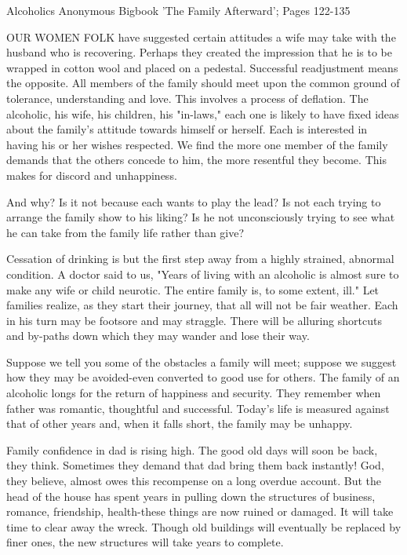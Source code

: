 
Alcoholics Anonymous Bigbook 'The Family Afterward'; Pages 122-135

\begin{biblechapter}
OUR WOMEN FOLK have suggested certain attitudes a wife may take with the husband who is recovering.  Perhaps they created the impression that he is to be wrapped in cotton wool and placed on a pedestal.  Successful readjustment means the opposite.  All members of the family should meet upon the common ground of tolerance, understanding and love.  This involves a process of deflation.  The alcoholic, his wife, his children, his "in-laws," each one is likely to have fixed ideas about the family's attitude towards himself or herself.  Each is interested in having his or her wishes respected.  We find the more one member of the family demands that the others concede to him, the more resentful they become.  This makes for discord and unhappiness.

And why?  Is it not because each wants to play the lead?  Is not each trying to arrange the family show to his liking?  Is he not unconsciously trying to see what he can take from the family life rather than give?

Cessation of drinking is but the first step away from a highly strained, abnormal condition.  A doctor said to us, "Years of living with an alcoholic is almost sure to make any wife or child neurotic.  The entire family is, to some extent, ill."  Let families realize, as they start their journey, that all will not be fair weather.  Each in his turn may be footsore and may straggle.  There will be alluring shortcuts and by-paths down which they may wander and lose their way.

Suppose we tell you some of the obstacles a family will meet; suppose we suggest how they may be avoided-even converted to good use for others.  The family of an alcoholic longs for the return of happiness and security.  They remember when father was romantic, thoughtful and successful.  Today's life is measured against that of other years and, when it falls short, the family may be unhappy.

Family confidence in dad is rising high.  The good old days will soon be back, they think.  Sometimes they demand that dad bring them back instantly!  God, they believe, almost owes this recompense on a long overdue account.  But the head of the house has spent years in pulling down the structures of business, romance, friendship, health-these things are now ruined or damaged.  It will take time to clear away the wreck.  Though old buildings will eventually be replaced by finer ones, the new structures will take years to complete.


\end{biblechapter}
